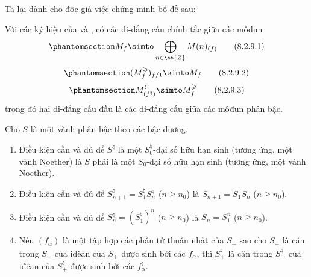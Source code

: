 \documentclass[oneside,10pt]{amsart}
\renewcommand{\geq}{\geqslant}
\let\EGAOriginalLabel\label
\renewcommand{\label}[1]{\phantomsection\EGAOriginalLabel{#1}}
\begin{document}
Ta lại dành cho độc giả việc chứng minh bổ đề sau:
\begin{lemma}[8.2.9]
\label{II.8.2.9}
Với các ký hiệu của  và , có các di-đẳng cấu chính tắc giữa các môđun
\[
\label{II.8.2.9.1}
  M_f \simto \bigoplus_{n\in\bb{Z}} M(n)_{(f)}
\tag{8.2.9.1}
\]
\[
\label{II.8.2.9.2}
  (M_f^\geq)_{f/1} \simto M_f
\tag{8.2.9.2}
\]
\[
\label{II.8.2.9.3}
  M_{(f^\natural)}^\natural \simto M_f^\geq
\tag{8.2.9.3}
\]
trong đó hai di-đẳng cấu đầu là các di-đẳng cấu giữa các môđun phân bậc.
\end{lemma}

\begin{lemma}[8.2.10]
\label{II.8.2.10}
Cho $S$ là một vành phân bậc theo các bậc dương.
\begin{enumerate}
  \item[\rm{(i)}] Điều kiện cần và đủ để $S^\natural$ là một $S_0^\natural$-đại số hữu hạn sinh (tương ứng, một vành Noether) là $S$ phải là một $S_0$-đại số hữu hạn sinh (tương ứng, một vành Noether).
  \item[\rm{(ii)}] Điều kiện cần và đủ để $S_{n+1}^\natural = S_1^\natural S_n^\natural$ ($n\geq n_0$) là $S_{n+1}=S_1S_n$ ($n\geq n_0$).
  \item[\rm{(iii)}] Điều kiện cần và đủ để $S_n^\natural = (S_1^\natural)^n$ ($n\geq n_0$) là $S_n=S_1^n$ ($n\geq n_0$).
  \item[\rm{(iv)}] Nếu $(f_\alpha)$ là một tập hợp các phần tử thuần nhất của $S_+$ sao cho $S_+$ là căn trong $S_+$ của iđêan của $S_+$ được sinh bởi các $f_\alpha$, thì $S_+^\natural$ là căn trong $S_+^\natural$ của iđêan của $S_+^\natural$ được sinh bởi các $f_\alpha^\natural$.
\end{enumerate}
\end{lemma}
\end{document}
